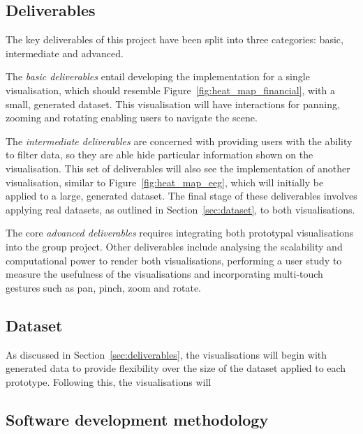 \documentclass[
	fontsize=11pt
	headlines=2,
	footlines=2,
	parskip=half
]{scrartcl}
\begin{document}
{		\subsection{Deliverables} {
		\label{sec:deliverables}

			The key deliverables of this project have been split into three categories: basic, intermediate and advanced.

			The \emph{basic deliverables} entail developing the implementation for a single visualisation, which should resemble Figure~\ref{fig:heat_map_financial}, with a small, generated dataset. This visualisation will have interactions for panning, zooming and rotating enabling users to navigate the scene.

			The \emph{intermediate deliverables} are concerned with providing users with the ability to filter data, so they are able hide particular information shown on the visualisation. This set of deliverables will also see the implementation of another visualisation, similar to Figure~\ref{fig:heat_map_eeg}, which will initially be applied to a large, generated dataset. The final stage of these deliverables involves applying real datasets, as outlined in Section~\ref{sec:dataset}, to both visualisations.

			The core \emph{advanced deliverables} requires integrating both prototypal visualisations into the group project. Other deliverables include analysing the scalability and computational power to render both visualisations, performing a user study to measure the usefulness of the visualisations and incorporating multi-touch gestures such as pan, pinch, zoom and rotate.

		}

		\subsection{Dataset} {
		\label{sec:dataset}

			As discussed in Section~\ref{sec:deliverables}, the visualisations will begin with generated data to provide flexibility over the size of the dataset applied to each prototype. Following this, the visualisations will 


		
		}

		\subsection{Software development methodology} {
		\label{sec:software_development_methodology}


}}
\end{document}

